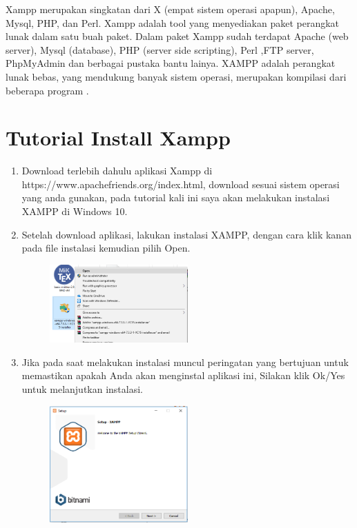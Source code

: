 Xampp merupakan singkatan dari X (empat sistem operasi apapun), Apache, Mysql, PHP, dan Perl. Xampp adalah tool yang menyediakan paket perangkat lunak dalam satu buah paket. Dalam paket Xampp sudah terdapat Apache (web server), Mysql (database), PHP (server side scripting), Perl ,FTP server, PhpMyAdmin dan berbagai pustaka bantu lainya. XAMPP adalah perangkat lunak bebas, yang mendukung banyak sistem operasi, merupakan kompilasi dari beberapa program \cite{sugiarto2019aplikasi}.

\section{Tutorial Install Xampp}
\begin{enumerate}
    \item Download terlebih dahulu aplikasi Xampp di https://www.apachefriends.org/index.html, download sesuai sistem operasi yang anda gunakan, pada tutorial kali ini saya akan melakukan instalasi XAMPP di Windows 10.
    
	\item Setelah download aplikasi, lakukan instalasi XAMPP, dengan cara klik kanan pada file instalasi kemudian pilih Open.
		\begin{figure}[!htbp]
    		\centering
    		\includegraphics[width=0.5\textwidth]{figures/Xampp2.png}
    		\label{Xampp2}
		\end{figure}
		
	\item Jika pada saat melakukan instalasi muncul peringatan yang bertujuan untuk memastikan apakah Anda akan menginstal aplikasi ini, Silakan klik Ok/Yes untuk melanjutkan instalasi.
		\begin{figure}[!htbp]
    		\centering
    		\includegraphics[width=0.5\textwidth]{figures/Xampp3.PNG}
    		\label{Xampp3}
		\end{figure}
		

\end{enumerate}
